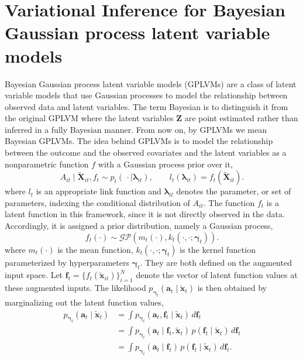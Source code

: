 \section{Variational Inference for Bayesian Gaussian process latent variable models}
Bayesian Gaussian 
process latent variable models (GPLVMs) \cite{titsiasBayesianGaussianProcess2010} are 
a class of latent variable models that use Gaussian processes to model the relationship between observed data and latent variables. 
The term Bayesian is to distinguish it from the original 
GPLVM \cite{lawrenceGaussianProcessLatent2003} 
where the latent variables \( \mathbf{Z} \) are point estimated rather than 
inferred in a fully Bayesian manner. From now on, by GPLVMs we mean Bayesian GPLVMs. 
The idea behind GPLVMs is to model the relationship between the outcome and the 
observed covariates 
and the latent variables as a nonparametric function $f$ with a Gaussian process prior 
over it, 
\[
A_{it} \mid \widetilde{\mathbf{X}}_{it}, f_t
\sim p_t\!\left(\,\cdot \mid \boldsymbol{\lambda}_{it}\right),
\qquad
l_t(\boldsymbol{\lambda}_{it}) = f_t(\widetilde{\mathbf{X}}_{it}).
\]
where \(l_t\) is an appropriate link function and \(\boldsymbol{\lambda}_{it}\)
denotes the parameter, or set of parameters, indexing the conditional distribution of $A_{it}$. 
The function \(f_t\) is a latent function 
in this framework, since it is not directly observed in the data.
Accordingly, it is assigned a prior distribution, namely a Gaussian process,
\[
f_t(\cdot) \sim \mathcal{GP}\!\left(m_t(\cdot), k_t(\cdot,\cdot;\boldsymbol{\gamma}_t)\right).
\]
where \(m_t(\cdot)\) is the mean function, \(k_t(\cdot, \cdot; \boldsymbol{\gamma}_t)\) 
is the kernel function parameterized by hyperparameters \(\boldsymbol{\gamma}_t\). 
They are 
both defined on the augmented input space. Let
\(
\mathbf{f}_t=\{f_t(\widetilde{\mathbf{x}}_{it})\}_{i=1}^N
\)
denote the vector of latent function values at these augmented inputs. 
The likelihood \(p_{\boldsymbol{\gamma}_t}(\mathbf{a}_{t}\mid 
\widetilde{\mathbf{x}}_{t})\)
is then obtained by marginalizing out the latent function values,
\begin{align}
p_{\boldsymbol{\gamma}_t}(\mathbf{a}_{t}\mid \widetilde{\mathbf{x}}_{t}) \nonumber
&=\int p_{\boldsymbol{\gamma}_t}(\mathbf{a}_{t}, \mathbf{f}_t\mid \widetilde{\mathbf{x}}_{t})\, d\mathbf{f}_t \nonumber \\ 
&=\int p_{\boldsymbol{\gamma}_t}(\mathbf{a}_{t}\mid \mathbf{f}_t, \widetilde{\mathbf{x}}_{t}) \, p(\mathbf{f}_t\mid \widetilde{\mathbf{x}}_{t})\, d\mathbf{f}_t \nonumber\\
&=\int p_{\boldsymbol{\gamma}_t}(\mathbf{a}_{t}\mid \mathbf{f}_t) \, p(\mathbf{f}_t\mid \widetilde{\mathbf{x}}_{t})\, d\mathbf{f}_t.
\label{eq:marginalized_over_f}
\end{align}
